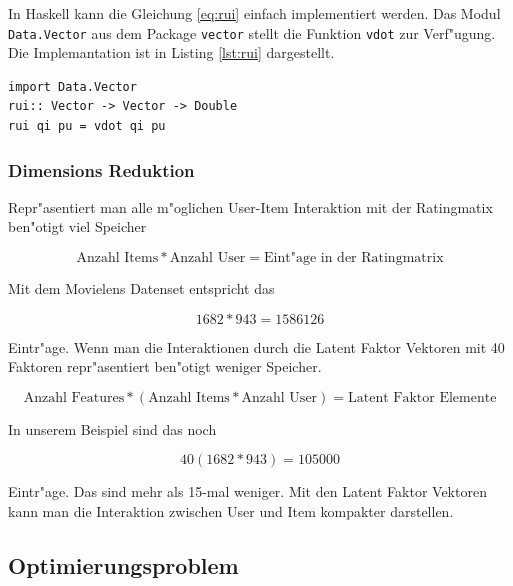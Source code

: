 \documentclass[a4paper, 12pt]{article}
\begin{document}
In Haskell kann die Gleichung \ref{eq:rui} einfach implementiert werden. Das Modul \verb|Data.Vector| aus dem Package \verb|vector| stellt die Funktion \verb|vdot| zur Verf"ugung. Die Implemantation ist in Listing \ref{lst:rui} dargestellt.

\begin{lstlisting}[caption=Implementation der Vorhersage, label=lst:rui]
import Data.Vector
rui:: Vector -> Vector -> Double
rui qi pu = vdot qi pu
\end{lstlisting}

\subsubsection{Dimensions Reduktion}
\label{sec:dimred}

Repr"asentiert man alle m"oglichen User-Item Interaktion mit der Ratingmatix ben"otigt viel Speicher

\begin{equation}
  \label{eq:dimre1}
  \text{Anzahl Items} * \text{Anzahl User} = \text{Eint"age in der Ratingmatrix}
\end{equation}

Mit dem Movielens Datenset entspricht das

\begin{equation}
  \label{eq:dimre}
  1682 * 943 = 1586126
\end{equation}

Eintr"age. Wenn man die Interaktionen durch die Latent Faktor Vektoren mit 40 Faktoren repr"asentiert ben"otigt weniger Speicher. 

\begin{equation}
  \label{eq:dimred}
  \text{Anzahl Features}* (\text{Anzahl Items}*\text{Anzahl User}) = \text{Latent Faktor Elemente}
\end{equation}

In unserem Beispiel sind das noch

\begin{equation}
  \label{eq:dimred1}
  40(1682*943) = 105000
\end{equation}

Eintr"age. Das sind mehr als 15-mal weniger. Mit den Latent Faktor Vektoren kann man die Interaktion zwischen User und Item kompakter darstellen.

\subsection{Optimierungsproblem}
\label{sec:optim}
\end{document}
